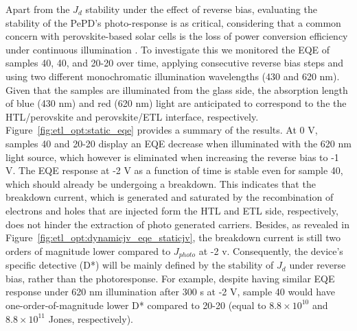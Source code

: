 Apart from the $J_d$ stability under the effect of reverse bias, evaluating the stability of the PePD's photo-response is as critical, considering that a common concern with perovskite-based solar cells is the loss of power conversion efficiency under continuous illumination \cite{Song2022CriticalAdditives, Fu2019I2Conditions,Khadka2021InsightsJunction}. To investigate this we monitored the EQE of samples 40, 40, and 20-20 over time, applying consecutive reverse bias steps and using two different monochromatic illumination wavelengths (430 and 620 nm). Given that the samples are illuminated from the glass side, the absorption length of blue (430 nm) and red (620 nm) light are anticipated to correspond to the the HTL/perovskite and perovskite/ETL interface, respectively. Figure~\ref{fig:etl_opt:static_eqe} provides a summary of the results. At 0 V, samples 40 and 20-20 display an EQE decrease when illuminated with the 620 nm light source, which however is eliminated when increasing the reverse bias to -1 V. The EQE response at -2 V as a function of time is stable even for sample 40, which should already be undergoing a breakdown. This indicates that the breakdown current, which is generated and saturated by the recombination of electrons and holes that are injected form the HTL and ETL side, respectively, does not hinder the extraction of photo generated carriers. Besides, as revealed in Figure~\ref{fig:etl_opt:dynamicjv_eqe_staticjv}, the breakdown current is still two orders of magnitude lower compared to $J_{photo}$ at -2 v. Consequently, the device's specific detective (D*) will be mainly defined by the stability of $J_d$ under reverse bias, rather than the photoresponse. For example, despite having similar EQE response under 620 nm illumination after 300 s at -2 V, sample 40 would have one-order-of-magnitude lower D* compared to 20-20 (equal to $8.8\times 10^{10}$ and  $8.8\times 10^{11}$ Jones, respectively). 

